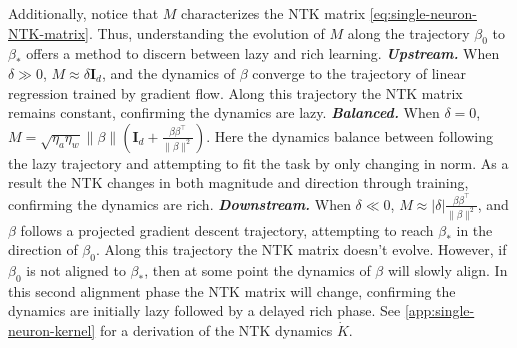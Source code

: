 \documentclass{article}
\theoremstyle{plain}
\theoremstyle{definition}
\theoremstyle{remark}
\begin{document}
%
Additionally, notice that $M$ characterizes the NTK matrix \cref{eq:single-neuron-NTK-matrix}. 
%
Thus, understanding the evolution of $M$ along the trajectory $\beta_0$ to $\beta_*$ offers a method to discern between lazy and rich learning.
%
\emph{\textbf{Upstream.}} When $\delta \gg 0$, $M \approx \delta \mathbf{I}_d$, and the dynamics of $\beta$ converge to the trajectory of linear regression trained by gradient flow.
%
Along this trajectory the NTK matrix remains constant, confirming the dynamics are lazy.
%
\emph{\textbf{Balanced.}} When $\delta = 0$, $M = \sqrt{\eta_a\eta_w}\|\beta\|(\mathbf{I}_d + \tfrac{\beta\beta^\intercal}{\|\beta\|^2})$. %
%
Here the dynamics balance between following the lazy trajectory and attempting to fit the task by only changing in norm.
%
As a result the NTK changes in both magnitude and direction through training, confirming the dynamics are rich.
%
\emph{\textbf{Downstream.}} When $\delta \ll 0$, $M \approx |\delta| \tfrac{\beta\beta^\intercal}{\|\beta\|^2}$, and $\beta$ follows a projected gradient descent trajectory, attempting to reach $\beta_*$ in the direction of $\beta_0$.
%
Along this trajectory the NTK matrix doesn't evolve.
%
However, if $\beta_0$ is not aligned to $\beta_*$, then at some point the dynamics of $\beta$ will slowly align.
%
In this second alignment phase the NTK matrix will change, confirming the dynamics are initially lazy followed by a delayed rich phase. 
% 
See \cref{app:single-neuron-kernel} for a derivation of the NTK dynamics $\dot{K}$.
\end{document}
